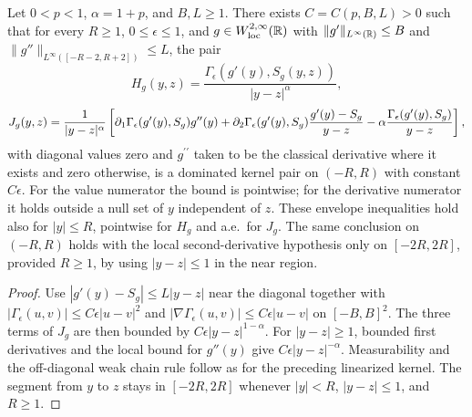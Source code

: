 \begin{lemma}
  \label{lem:c10_profile_kernel_bounds}
  Let $0<p<1$, $\alpha=1+p$, and $B,L\ge1$. There exists $C=C(p,B,L)>0$ such that for every
  $R\ge1$, $0\le\epsilon\le1$, and $g\in W^{2,\infty}_{\mathrm{loc}}(\mathbb{R})$ with
  $\|g'\|_{L^\infty(\mathbb{R})}\le B$ and $\|g''\|_{L^\infty([-R-2,R+2])}\le L$, the pair
  \[
    H_g(y,z)=\frac{\Gamma_\epsilon(g'(y),S_g(y,z))}{|y-z|^\alpha},
  \]
  \[
    J_g(y,z)=\frac{1}{|y-z|^\alpha}\left[
      \partial_1\Gamma_\epsilon(g'(y),S_g)g''(y)
      +\partial_2\Gamma_\epsilon(g'(y),S_g)\frac{g'(y)-S_g}{y-z}
      -\alpha\frac{\Gamma_\epsilon(g'(y),S_g)}{y-z}\right],
  \]
  with diagonal values zero and $g^{\prime\prime}$ taken to be the classical derivative where it exists
  and zero otherwise, is a dominated kernel
  pair on $(-R,R)$ with constant $C\epsilon$. For the value numerator the bound is pointwise;
  for the derivative numerator it holds outside a null set of $y$ independent of $z$.
  These envelope inequalities hold also for $|y|\le R$, pointwise for $H_g$ and a.e.\ for $J_g$.
  The same conclusion on $(-R,R)$ holds with the local second-derivative hypothesis only on
  $[-2R,2R]$, provided $R\ge1$, by using $|y-z|\le1$ in the near region.
\end{lemma}
\begin{proof}
  Use $|g'(y)-S_g|\le L|y-z|$ near the diagonal together with
  $|\Gamma_\epsilon(u,v)|\le C\epsilon|u-v|^2$ and
  $|\nabla\Gamma_\epsilon(u,v)|\le C\epsilon|u-v|$ on $[-B,B]^2$.
  The three terms of $J_g$ are then bounded by $C\epsilon|y-z|^{1-\alpha}$.
  For $|y-z|\ge1$, bounded first derivatives and the local bound for $g''(y)$ give
  $C\epsilon|y-z|^{-\alpha}$. Measurability and the off-diagonal weak chain rule follow as for
  the preceding linearized kernel. The segment from $y$ to $z$ stays in $[-2R,2R]$ whenever
  $|y|<R$, $|y-z|\le1$, and $R\ge1$.
\end{proof}

